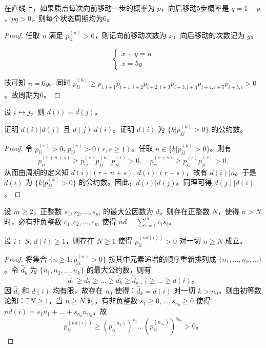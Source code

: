 \documentclass[lang=cn,10pt,thmcnt=section]{elegantbook}
\begin{document}
\begin{example}
	在直线上，如果质点每次向前移动一步的概率为 $p$，向后移动5步概率是 $q = 1 - p$，$pq > 0$，则每个状态周期均为6。

\end{example}
\begin{proof}
	任取 $n$ 满足 $p_{ii}^{(n)} > 0$，则记向前移动次数为 $x$，向后移动的次数记为 $y$。

\begin{equation*}
\begin{cases}
x + y = n \\
x = 5y
\end{cases}
\end{equation*}

故可知 $n = 6y$。同时 $p_{ii}^{(6)} \geq p_{i,i+1} p_{i+1,i+2} p_{i+2,i+3} p_{i+3,i+4} p_{i+4,i+5} p_{i+5,i} > 0$。故周期为6。

\end{proof}
\begin{theorem}
	设 $i \leftrightarrow j$，则 $d(i) = d(j)$。

证明 $d(i) | d(j)$ 且 $d(j) | d(i)$。证明 $d(i)$ 为 $\{k | p_{jj}^{(k)} > 0\}$ 的公约数。
\end{theorem}
\begin{proof}
	令 $p_{ii}^{(r)} > 0$, $p_{ij}^{(s)} > 0 (r, s \geq 1)$。任取 $n \in \{k | p_{jj}^{(k)} > 0\}$。则有
\[
p_{ii}^{(r+n+s)} \geq p_{ij}^{(s)} p_{jj}^{(n)} p_{ji}^{(r)} > 0, \quad p_{ii}^{(r+s)} \geq p_{ij}^{(s)} p_{ji}^{(r)} > 0.
\]
从而由周期的定义知 $d(i) | (r+n+s)$, $d(i) | (r+s)$，故有 $d(i) | n$。于是 $d(i)$ 为 $\{k | p_{jj}^{(k)} > 0\}$ 的公约数。因此，$d(i) | d(j)$。同理可得 $d(j) | d(i)$。
\end{proof}
\begin{lemma}
	设 $m \geq 2$，正整数 $s_1, s_2, \ldots, s_m$ 的最大公因数为 $d$，则存在正整数 $N$，使得 $n > N$ 时，必有非负整数 $c_1, c_2, \ldots, c_m$ 使得 $nd = \sum_{i=1}^{m} c_i s_i$。
\end{lemma}

\begin{theorem}\label{3.7}
	设 $i \in S$, $d(i) \geq 1$，则存在 $N \geq 1$ 使得 $p_{ii}^{(nd(i))} > 0$ 对一切 $n \geq N$ 成立。
\end{theorem}
\begin{proof}
	将集合 $\{n \geq 1 : p_{ii}^{(n)} > 0\}$ 按其中元素递增的顺序重新排列成 $\{n_1, \ldots, n_k, \ldots\}$。令 $\hat{d}_k$ 为 $\{n_1, n_2, \ldots, n_k\}$ 的最大公约数，则有
\[
\hat{d}_1 \geq \hat{d}_2 \geq \ldots \geq \hat{d}_k \geq \hat{d}_{k+1} \geq \ldots \geq d(i)。
\]
因 $\hat{d}_i$ 和 $d(i)$ 均有限，故存在 $n_0$ 使得：$\hat{d}_k = d(i)$ 对一切 $k > n_0$。则由初等数论知：$\exists N \geq 1$，当 $n \geq N$ 时，有非负整数 $s_1 \geq 0, \ldots, s_{n_0} \geq 0$ 使得 $nd(i) = s_1 n_1 + \ldots + s_{n_0} n_{n_0}$。故
\[
p_{ii}^{(nd(i))} \geq (p_{ii}^{(n_1)})^{s_1} \ldots (p_{ii}^{(n_{n_0})})^{s_{n_0}} > 0。
\]
\end{proof}
\end{document}
